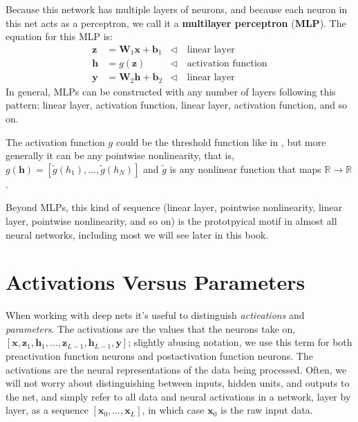 Because this network has multiple layers of neurons, and because each neuron in this net acts as a perceptron, we call it a \textbf{multilayer perceptron} (\textbf{MLP}). The equation for this MLP is:
\begin{align}
    \mathbf{z} &= \mathbf{W}_1\mathbf{x} + \mathbf{b}_1 &\triangleleft \quad \text{linear layer}\\
    \mathbf{h} &= g(\mathbf{z}) &\triangleleft \quad \text{activation function}\\
    \mathbf{y} &= \mathbf{W}_2\mathbf{h} + \mathbf{b}_2 &\triangleleft \quad \text{linear layer}
\end{align}
In general, MLPs can be constructed with any number of layers following this pattern: linear layer, activation function, linear layer, activation function, and so on.

The activation function $g$ could be the threshold function like in \eqn{\ref{eqn:neural_nets:perceptron_activation}}, but more generally it can be any pointwise nonlinearity, that is, $g(\mathbf{h}) = [\tilde{g}(h_1), \ldots, \tilde{g}(h_N)]$ and $\tilde{g}$ is any nonlinear function that maps $\mathbb{R} \rightarrow \mathbb{R}$.

Beyond MLPs, this kind of sequence (linear layer, pointwise nonlinearity, linear layer, pointwise nonlinearity, and so on) is the prototpyical motif in almost all neural networks, including most we will see later in this book.

\section{Activations Versus Parameters}

When working with deep nets it's useful to distinguish \emph{activations} and \emph{parameters}. The activations are the values that the neurons take on, $[\mathbf{x}, \mathbf{z}_1, \mathbf{h}_1, \ldots, \mathbf{z}_{L-1}, \mathbf{h}_{L-1}, \mathbf{y}]$; slightly abusing notation, we use this term for both preactivation function neurons and postactivation function neurons. The activations are the neural representations of the data being processed. Often, we will not worry about distinguishing between inputs, hidden units, and outputs to the net, and simply refer to all data and neural activations in a network, layer by layer, as a sequence $[\mathbf{x}_0, \ldots, \mathbf{x}_L]$, in which case $\mathbf{x}_0$ is the raw input data.

